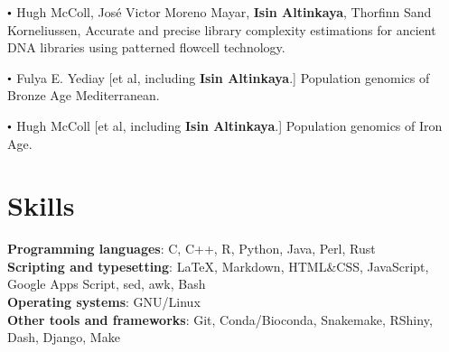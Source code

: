 \documentclass[letterpaper,10.5pt]{article}
\newcommand\sbullet[1][.5]{\mathbin{\vcenter{\hbox{\scalebox{#1}{$\bullet$}}}}}
\begin{document}
\smallskip

$\sbullet[.6]$ \hspace{0.74cm}  Hugh McColl, Jos\'e Victor Moreno Mayar, \textbf{Isin Altinkaya}, Thorfinn Sand Korneliussen, Accurate and precise library complexity estimations for ancient DNA libraries using patterned flowcell technology. \\
\smallskip

$\sbullet[.6]$ \hspace{0.74cm}  Fulya E. Yediay [et al, including \textbf{Isin Altinkaya}.]  Population genomics of Bronze Age Mediterranean. \\
\smallskip

$\sbullet[.6]$ \hspace{0.74cm}  Hugh McColl [et al, including \textbf{Isin Altinkaya}.]  Population genomics of Iron Age. \\



\section{Skills}
\textbf{Programming languages}: C, C++, R, Python, Java, Perl, Rust \\
\textbf{Scripting and typesetting}: \LaTeX, Markdown, HTML\&CSS, JavaScript, Google Apps Script, sed, awk, Bash \\
\textbf{Operating systems}: GNU/Linux \\
\textbf{Other tools and frameworks}: Git,  Conda/Bioconda, Snakemake, RShiny, Dash, Django, Make \\


\end{document}
